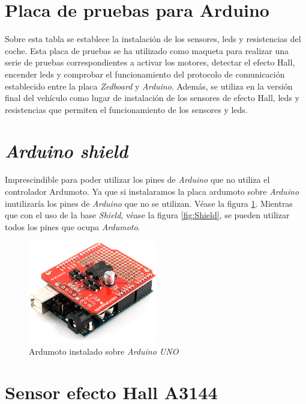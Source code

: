 \section{Placa de pruebas para Arduino}

Sobre esta tabla se establece la instalación de los sensores, leds y resistencias del coche. Esta placa de pruebas se ha utilizado como maqueta para realizar una serie de pruebas correspondientes a activar los motores, detectar el efecto Hall, encender leds y comprobar el funcionamiento del protocolo de comunicación establecido entre la placa \emph{Zedboard} y \emph{Arduino}. Además, se utiliza en la versión final del vehículo como lugar de instalación de los sensores de efecto Hall, leds y resistencias que permiten el funcionamiento de los sensores y leds. 

\section{\emph{Arduino shield}}

Imprescindible para poder utilizar los pines de \emph{Arduino} que no utiliza el controlador Ardumoto. Ya que si instalaramos la placa ardumoto sobre \emph{Arduino} inutilizaría los pines de \emph{Arduino} que no se utilizan. Véase la figura \ref{fig:ArdumotoShield}. Mientras que con el uso de la base \emph{Shield}, véase la figura \ref{fig:Shield}, se pueden utilizar todos los pines que ocupa \emph{Ardumoto}.

\begin{figure}[hbtp]
 \centering
   \includegraphics[width=0.5\textwidth]{./figures/ArdumotoShield.png}
 \caption{Ardumoto instalado sobre \emph{Arduino UNO}}
 \label{fig:ArdumotoShield}
\end{figure}

\section{Sensor efecto Hall A3144}


